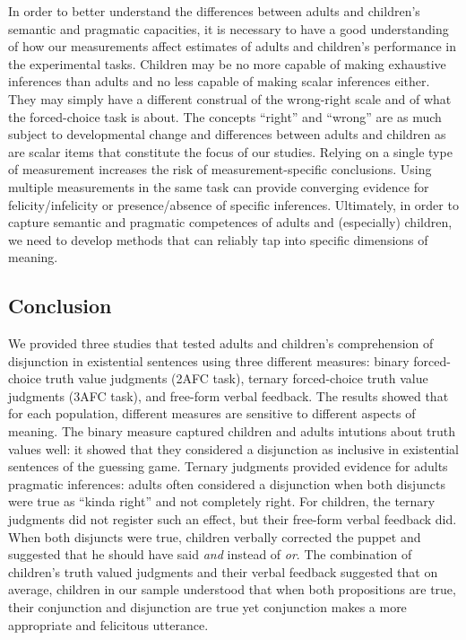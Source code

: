 \documentclass[floatsintext,man]{apa6}
\theoremstyle{definition}
\theoremstyle{definition}
\theoremstyle{definition}
\theoremstyle{remark}
\begin{document}
In order to better understand the differences between adults and
children's semantic and pragmatic capacities, it is necessary to have a
good understanding of how our measurements affect estimates of adults
and children's performance in the experimental tasks. Children may be no
more capable of making exhaustive inferences than adults and no less
capable of making scalar inferences either. They may simply have a
different construal of the wrong-right scale and of what the
forced-choice task is about. The concepts \enquote{right} and
\enquote{wrong} are as much subject to developmental change and
differences between adults and children as are scalar items that
constitute the focus of our studies. Relying on a single type of
measurement increases the risk of measurement-specific conclusions.
Using multiple measurements in the same task can provide converging
evidence for felicity/infelicity or presence/absence of specific
inferences. Ultimately, in order to capture semantic and pragmatic
competences of adults and (especially) children, we need to develop
methods that can reliably tap into specific dimensions of meaning.

\subsection{Conclusion}\label{conclusion}

We provided three studies that tested adults and children's
comprehension of disjunction in existential sentences using three
different measures: binary forced-choice truth value judgments (2AFC
task), ternary forced-choice truth value judgments (3AFC task), and
free-form verbal feedback. The results showed that for each population,
different measures are sensitive to different aspects of meaning. The
binary measure captured children and adults intutions about truth values
well: it showed that they considered a disjunction as inclusive in
existential sentences of the guessing game. Ternary judgments provided
evidence for adults pragmatic inferences: adults often considered a
disjunction when both disjuncts were true as \enquote{kinda right} and
not completely right. For children, the ternary judgments did not
register such an effect, but their free-form verbal feedback did. When
both disjuncts were true, children verbally corrected the puppet and
suggested that he should have said \emph{and} instead of \emph{or}. The
combination of children's truth valued judgments and their verbal
feedback suggested that on average, children in our sample understood
that when both propositions are true, their conjunction and disjunction
are true yet conjunction makes a more appropriate and felicitous
utterance.
\end{document}
